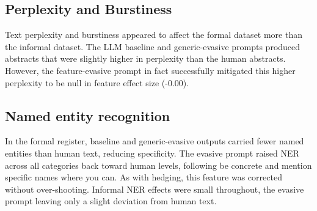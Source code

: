 \documentclass[thesis]{cluu}
\begin{document}
\subsection{Perplexity and Burstiness}

Text perplexity and burstiness appeared to affect the formal dataset more than the informal dataset. The LLM baseline and generic-evasive prompts produced abstracts that were slightly higher in perplexity than the human abstracts. However, the feature-evasive prompt in fact successfully mitigated this higher perplexity to be null in feature effect size (-0.00). 

\subsection{Named entity recognition} In the formal register, baseline and generic-evasive outputs carried fewer named entities than human text, reducing specificity. The evasive prompt raised NER across all categories back toward human levels, following be concrete and mention specific names where you can. As with hedging, this feature was corrected without over-shooting. Informal NER effects were small throughout, the evasive prompt leaving only a slight deviation from human text.
\end{document}

